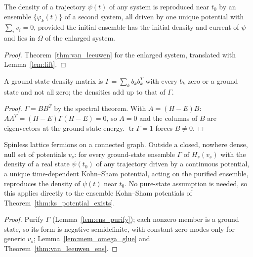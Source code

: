 \begin{theorem}
  \label{thm:van_leeuwen_ens}
  \leanok
  The density of a trajectory $\psi(t)$ of any system is reproduced near $t_0$ by an ensemble $\{\varphi_k(t)\}$ of a
  second system, all driven by one unique potential with $\sum_iv_i=0$, provided the initial ensemble has the initial
  density and current of $\psi$ and lies in $\Omega$ of the enlarged system.
\end{theorem}
\begin{proof}
  \leanok
  Theorem~\ref{thm:van_leeuwen} for the enlarged system, translated with Lemma~\ref{lem:lift}.
\end{proof}

\begin{lemma}
  \label{lem:ens_purify}
  \leanok
  A ground-state density matrix is $\Gamma=\sum_kb_kb_k^T$ with every $b_k$ zero or a ground state and not all zero;
  the densities add up to that of $\Gamma$.
\end{lemma}
\begin{proof}
  \leanok
  $\Gamma=BB^T$ by the spectral theorem. With $A=(H-E)B$: $AA^T=(H-E)\Gamma(H-E)=0$, so $A=0$ and the columns of $B$
  are eigenvectors at the ground-state energy. $\operatorname{tr}\Gamma=1$ forces $B\neq0$.
\end{proof}

\begin{theorem}
  \label{thm:td_kohn_sham_ensemble}
  \leanok
  Spinless lattice fermions on a connected graph. Outside a closed, nowhere dense, null set of potentials $v_s$:
  for every ground-state ensemble $\Gamma$ of $H_s(v_s)$ with the density of a real state $\psi(t_0)$ of any trajectory
  driven by a continuous potential, a unique time-dependent Kohn--Sham potential, acting on the purified ensemble,
  reproduces the density of $\psi(t)$ near $t_0$. No pure-state assumption is needed, so this applies directly to the
  ensemble Kohn--Sham potentials of Theorem~\ref{thm:ks_potential_exists}.
\end{theorem}
\begin{proof}
  \leanok
  Purify $\Gamma$ (Lemma~\ref{lem:ens_purify}); each nonzero member is a ground state, so its form is negative
  semidefinite, with constant zero modes only for generic $v_s$; Lemma~\ref{lem:mem_omega_glue} and
  Theorem~\ref{thm:van_leeuwen_ens}.
\end{proof}

